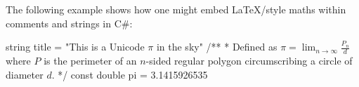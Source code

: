 The following example shows how one might embed \LaTeX\-/style maths within comments and strings in C\#:

\begin{listing}[H]
    \begin{csharpcode}
string title = "This is a Unicode $\pi$ in the sky"
/**
 * Defined as $\pi=\lim_{n\to\infty}\frac{P_n}{d}$ where $P$ is the perimeter of an $n$-sided regular polygon circumscribing a circle of diameter $d$.
 */
const double pi = 3.1415926535
    \end{csharpcode}
    \caption{Using mathematical notation in C\# code comments and strings.}
    \label{lst:csharpMath}
\end{listing}
